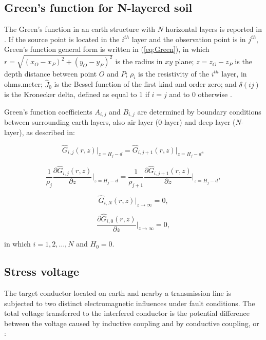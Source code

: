 \documentclass{IEEEtran4PSCC}
\begin{document}
\subsection{Green's function for N-layered soil}

The Green's function in an earth structure with $N$ horizontal layers is reported in \cite{He2012,Li2006}. If the source point is located in the $i^{th}$ layer and the observation point is in $j^{th}$, Green's function general form is written in (\ref{eq:Green}), in which $r = \sqrt{(x_{O} - x_{P})^{2} + (y_{O} - y_{P})^{2}}$ is the radius in $xy$ plane; $z = z_{O} - z_{P}$ is the depth distance between point $O$ and $P$; $\rho_{i}$ is the resistivity of the $i^{th}$ layer, in ohms.meter; $\hat{J}_{0}$ is the Bessel function of the first kind and order zero; and $\delta(ij)$ is the Kronecker delta, defined as equal to 1 if $i=j$ and to 0 otherwise \cite{Li2006}.

Green's function coefficients $A_{i,j}$ and $B_{i,j}$ are determined by boundary conditions between surrounding earth layers, also air layer (0-layer) and deep layer ($N$-layer), as described in:

\begin{equation}
	\hat{G}_{i,j}(r,z)\vert_{z = H_{j} - d} = \hat{G}_{i,j+1}(r,z)\vert_{z = H_{j} - d},
\end{equation}

\begin{equation}
	\frac{1}{\rho_{j}}\frac{\partial \hat{G}_{i,j}(r,z)}{\partial z}\bigg\vert_{z = H_{j} - d} = \frac{1}{\rho_{j+1}}\frac{\partial \hat{G}_{i,j+1}(r,z)}{\partial z}\bigg\vert_{z = H_{j} - d},
\end{equation}

\begin{equation}
	\hat{G}_{i,N}(r,z)\vert_{z\rightarrow \infty} = 0,
\end{equation}

\begin{equation}
	\frac{\partial \hat{G}_{i,0}(r,z)}{\partial z}\bigg\vert_{z\rightarrow \infty} = 0,
\end{equation}

\noindent in which $i=1,2,\dots,N$ and $H_{0} = 0$.

\subsection{Stress voltage}

The target conductor located on earth and nearby a transmission line is subjected to two distinct electromagnetic influences under fault conditions. The total voltage transferred to the interfered conductor is the potential difference between the voltage caused by inductive coupling and by conductive coupling, or \cite{IEEEStd80}:
\end{document}
